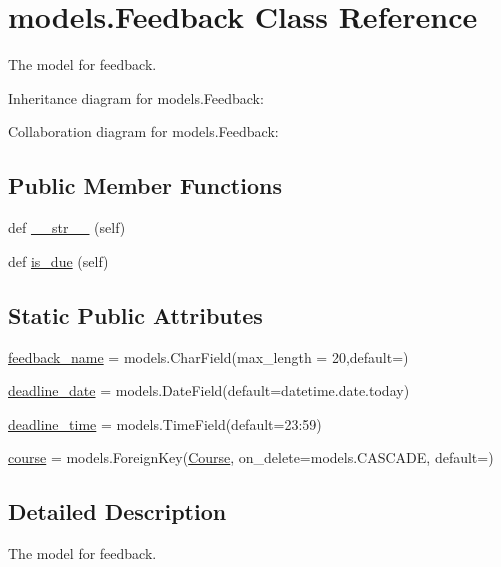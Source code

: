 \hypertarget{classmodels_1_1_feedback}{}\section{models.\+Feedback Class Reference}
\label{classmodels_1_1_feedback}


The model for feedback.  




Inheritance diagram for models.\+Feedback\+:


Collaboration diagram for models.\+Feedback\+:
\subsection*{Public Member Functions}
\begin{DoxyCompactItemize}
\item 
def \hyperlink{classmodels_1_1_feedback_afa35cf0a14d2b631a40a01d7d3847137}{\+\_\+\+\_\+str\+\_\+\+\_\+} (self)
\item 
def \hyperlink{classmodels_1_1_feedback_a0716162823aa511e5c1beea11d39b1f0}{is\+\_\+due} (self)
\end{DoxyCompactItemize}
\subsection*{Static Public Attributes}
\begin{DoxyCompactItemize}
\item 
\hyperlink{classmodels_1_1_feedback_a752d4d5603d15c1387803065c603639d}{feedback\+\_\+name} = models.\+Char\+Field(max\+\_\+length = 20,default=\textquotesingle{}\textquotesingle{})
\item 
\hyperlink{classmodels_1_1_feedback_acbdb0048ac21fa284ca76e2c4e7200ec}{deadline\+\_\+date} = models.\+Date\+Field(default=datetime.\+date.\+today)
\item 
\hyperlink{classmodels_1_1_feedback_ad72519619c1896899425e287a26d8f93}{deadline\+\_\+time} = models.\+Time\+Field(default=\textquotesingle{}23\+:59\textquotesingle{})
\item 
\hyperlink{classmodels_1_1_feedback_a18a97e4e0c860dd1528dc5b515f417f5}{course} = models.\+Foreign\+Key(\hyperlink{classmodels_1_1_course}{Course}, on\+\_\+delete=models.\+C\+A\+S\+C\+A\+DE, default=\textquotesingle{}\textquotesingle{})
\end{DoxyCompactItemize}


\subsection{Detailed Description}
The model for feedback. 

